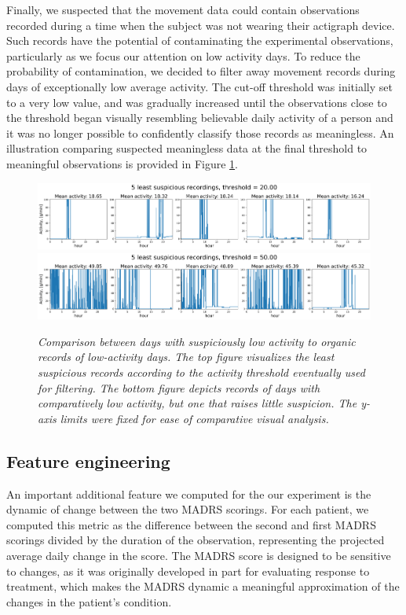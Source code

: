 \documentclass[12pt]{article}
\begin{document}
Finally, we suspected that the movement data could contain observations recorded during a time when the subject was not wearing their actigraph device. Such records have the potential of contaminating the experimental observations, particularly as we focus our attention on low activity days. To reduce the probability of contamination, we decided to filter away movement records during days of exceptionally low average activity. The cut-off threshold was initially set to a very low value, and was gradually increased until the observations close to the threshold began visually resembling believable daily activity of a person and it was no longer possible to confidently classify those records as meaningless. An illustration comparing suspected meaningless data at the final threshold to meaningful observations is provided in Figure \ref{fig:sus}.

\begin{figure}[!h]
    \centering
    \includegraphics[width=.99\textwidth]{images/sus.png}
    \includegraphics[width=.99\textwidth]{images/not_sus.png}
    \captionsetup{justification=centering}
    \caption{\textit{Comparison between days with suspiciously low activity to organic records of low-activity days. The top figure visualizes the least suspicious records according to the activity threshold eventually used for filtering. The bottom  figure depicts records of days with comparatively low activity, but one that raises little suspicion. The y-axis limits were fixed for ease of comparative visual analysis.}}
    \label{fig:sus}
\end{figure}


\subsection{Feature engineering}

An important additional feature we computed for the our experiment is the dynamic of change between the two MADRS scorings. For each patient, we computed this metric as the difference between the second and first MADRS scorings divided by the duration of the observation, representing the projected average daily change in the score. The MADRS score is designed to be sensitive to changes, as it was originally developed in part for evaluating response to treatment, which makes the MADRS dynamic a meaningful approximation of the changes in the patient's condition. 
\end{document}
